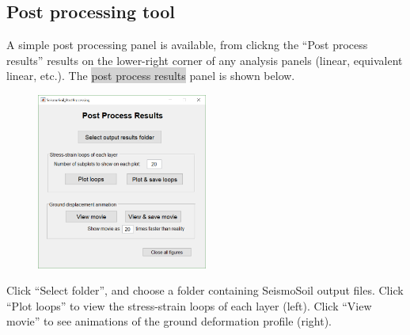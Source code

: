 \documentclass[11pt,letterpaper]{article}
\newcommand{\panel}[1]{\colorbox{lightgray}{\textsf{#1}}}
\begin{document}
\newpage
\subsection{Post processing tool}
A simple post processing panel is available, from clickng the ``\textsf{Post process results}'' results on the lower-right corner of any analysis panels (linear, equivalent linear, etc.). The \panel{post process results} panel is shown below.

\begin{figure}[H]
	\centering
	\includegraphics[width=0.50\textwidth]{PostProcessing.png}\\
\end{figure}

Click ``\textsf{Select folder}'', and choose a folder containing SeismoSoil output files. Click ``\textsf{Plot loops}'' to view the stress-strain loops of each layer (left). Click ``\textsf{View movie}'' to see animations of the ground deformation profile (right).

\begin{figure}[H]
	\centering
\end{figure}
\end{document}

